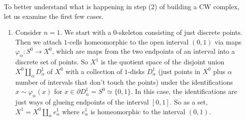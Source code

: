 \begin{example}
    To better understand what is happening in step (2) of building a CW complex, let us examine the first few cases.
    \begin{enumerate}[label=(\arabic*)]
        \item Consider $n=1$. We start with a $0$-skeleton consisting of just discrete points. Then we attach $1$-cells homeomorphic to the open interval $(0,1)$ via maps $\varphi _{\alpha }\colon S^0 \to X^0$, which are maps from the two endpoints of an interval into a discrete set of points. So $X^1$ is the quotient space of the disjoint union $X^0 \amalg_{\alpha }D^1_{\alpha }$ of $X^0$ with a collection of $1$-disks $D_{\alpha }^1$ (just points in $X^0$ plus $\alpha $ number of intervals that don't touch the points) under the identifications $x\sim \varphi _{\alpha }(x)$ for $x\in \partial D_{\alpha }^1 =S^{0} \simeq \{0,1\}$. In this case, the identifications are just ways of glueing endpoints of the interval $[0,1]$. So as a set, $X^1=X^0\amalg _{\alpha }e_{\alpha }^1$ where $e_{\alpha }^1$ is homeomorphic to the interval $(0,1)$. 


\end{enumerate}
\end{example}
